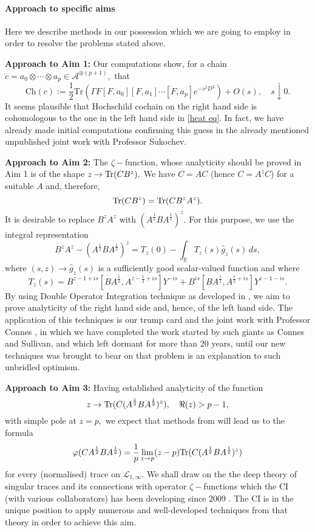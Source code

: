 \documentclass{article}
\begin{document}
\paragraph*{Approach to specific aims} Here we describe methods in our possession which we are going to employ in order to resolve the problems stated above.

{\bf Approach to Aim 1:} Our computations show, for a chain $c=a_0\otimes\cdots\otimes a_p\in\mathcal{A}^{\otimes (p+1)},$ that
$$\mathrm{Ch}(c) := \frac{1}{2}\mathrm{Tr}(\Gamma F[F,a_0][F,a_1]\cdots[F,a_p]e^{-s^2D^2})+O(s),\quad s\downarrow 0.$$
It seems plausible that Hochschild cochain on the right hand side is cohomologous to the one in the left hand side in \eqref{heat eq}. In fact, we have already made initial computations confirming this guess in the already mentioned unpublished joint work with Professor Sukochev.

{\bf Approach to Aim 2:} The $\zeta-$function, whose analyticity should be proved in Aim 1 is of the shape $z\to {\rm Tr}(CB^z).$ We have $C=AC$ (hence $C=A^zC$) for a suitable $A$ and, therefore,
$${\rm Tr}(CB^z)={\rm Tr}(CB^zA^z).$$
It is desirable to replace $B^zA^z$ with $(A^{\frac12}BA^{\frac12})^z.$ For this purpose, we use the integral representation
$$B^zA^z-(A^{\frac{1}{2}}BA^{\frac{1}{2}})^z = T_z(0)-\int_{\mathbb{R}} T_z(s)\widehat{g}_z(s)\,ds,$$ 
where $(s,z)\to\widehat{g}_z(s)$ is a sufficiently good scalar-valued function and where
$$T_z(s)= B^{z-1+is}[BA^{\frac{1}{2}},A^{z-\frac{1}{2}+is}]Y^{-is}+B^{is}[BA^{\frac{1}{2}},A^{\frac{1}{2}+is}]Y^{z-1-is}.$$
By using Double Operator Integration technique as developed in \cite{PotapovSukochev}, we aim to prove analyticity of the right hand side and, hence, of the left hand side. The application of this techniques is our trump card and the joint work with Professor Connes \cite{Connes_team}, in which we have completed the work started by such giants as Connes and Sullivan, and which left dormant for more than 20 years, until our new techniques was brought to bear on that problem is an explanation to such unbridled optimism.

{\bf Approach to Aim 3:} Having established analyticity of the function
$$z\to {\rm Tr}(C(A^{\frac12}BA^{\frac12})^z),\quad \Re(z)>p-1,$$
with simple pole at $z=p,$ we expect that methods from \cite{SUZ-indiana} will lead us to the formula
$$\varphi(CA^{\frac12}BA^{\frac12})=\frac1p\lim_{z\to p}(z-p){\rm Tr}(C(A^{\frac12}BA^{\frac12})^z)$$
for every (normalised) trace on $\mathcal{L}_{1,\infty}.$ We shall draw on the the deep theory of singular traces and its connections with operator $\zeta-$functions which the CI (with various collaborators) has been developing since 2009 \cite{book,SUZ-indiana}. The CI is in the unique position to apply numerous and well-developed techniques from that theory in order to achieve this aim.
\end{document}
